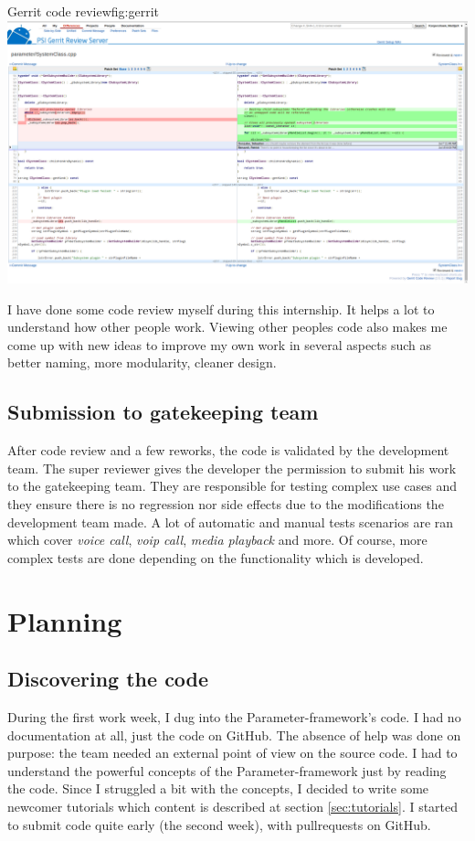 \begin{figureGraphics}{Gerrit code review}{fig:gerrit}
    \includegraphics[width=\textwidth]{./src/img/gerrit.png}
\end{figureGraphics}

I have done some code review myself during this internship. It helps a lot to
understand how other people work. Viewing other peoples code also makes me come
up with new ideas to improve my own work in several aspects such as better naming,
more modularity, cleaner design.

\subsection{Submission to gatekeeping team}
After code review and a few reworks, the code is validated by the development team.
The super reviewer gives the developer the permission to submit his work to the gatekeeping team.
They are responsible for testing complex use cases and they ensure there is no regression nor side effects
due to the modifications the development team made.
A lot of automatic and manual tests scenarios are ran which cover \emph{voice call}, \emph{voip call}, \emph{media playback}
and more. Of course, more complex tests are done depending on the functionality which is developed.



\section{Planning}
\subsection{Discovering the code}
During the first work week, I dug into the Parameter-framework's code. I had no
documentation at all, just the code on \gls{GitHub}. The absence of help was done on
purpose: the team needed an external point of view on the source code. I had
to understand the powerful concepts of the Parameter-framework just by reading
the code. Since I struggled a bit with the concepts, I decided to write some
newcomer tutorials which content is described at section \ref{sec:tutorials}.
I started to submit code quite early (the second week), with \gls{pullrequests} on \gls{GitHub}.

